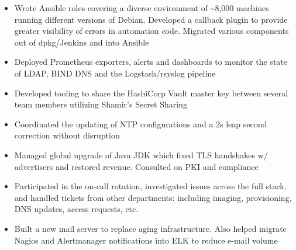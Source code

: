 \documentclass[10pt,a4paper,normalphoto]{altacv}
\begin{document}

\begin{fullwidth}
\makecvheader
\end{fullwidth}



\begin{itemize}
\item Wrote Ansible roles covering a diverse environment of \textasciitilde8,000 machines running different versions of Debian. Developed a callback plugin to provide greater visibility of errors in automation code. Migrated various components out of dpkg/Jenkins and into Ansible
\item Deployed Prometheus exporters, alerts and dashboards to monitor the state of LDAP, BIND DNS and the Logstash/rsyslog pipeline
\item Developed tooling to share the HashiCorp Vault master key between several team members utilizing Shamir's Secret Sharing
\item Coordinated the updating of NTP configurations and a 2s leap second correction without disruption
\item Managed global upgrade of Java JDK which fixed TLS handshakes w/ advertisers and restored revenue. Consulted on PKI and compliance
\item Participated in the on-call rotation, investigated issues across the full stack, and handled tickets from other departments: including imaging, provisioning, DNS updates, access requests, etc.
\item Built a new mail server to replace aging infrastructure. Also helped migrate Nagios and Alertmanager notifications into ELK to reduce e-mail volume
\end{itemize}
\end{document}
